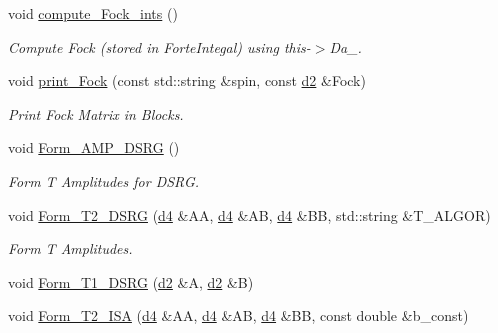 \begin{DoxyCompactItemize}
void \mbox{\hyperlink{classforte_1_1_m_c_s_r_g_p_t2___m_o_a81f13aa73866cbd8dd1589ffcce6de8f}{compute\+\_\+\+Fock\+\_\+ints}} ()
\begin{DoxyCompactList}\small\item\em Compute Fock (stored in Forte\+Integal) using this-\/$>$Da\+\_\+. \end{DoxyCompactList}\item 
void \mbox{\hyperlink{classforte_1_1_m_c_s_r_g_p_t2___m_o_a3090cb11611f7d3bd74dcb59ee431ffb}{print\+\_\+\+Fock}} (const std\+::string \&spin, const \mbox{\hyperlink{mcsrgpt2__mo_8h_ae5de8a172a3b363a852d6d32e6d90537}{d2}} \&Fock)
\begin{DoxyCompactList}\small\item\em Print Fock Matrix in Blocks. \end{DoxyCompactList}\item 
void \mbox{\hyperlink{classforte_1_1_m_c_s_r_g_p_t2___m_o_a220d94aaf515b4fa7ed3aec37f552baa}{Form\+\_\+\+A\+M\+P\+\_\+\+D\+S\+RG}} ()
\begin{DoxyCompactList}\small\item\em Form T Amplitudes for D\+S\+RG. \end{DoxyCompactList}\item 
void \mbox{\hyperlink{classforte_1_1_m_c_s_r_g_p_t2___m_o_a0ed08f7a03042f89508ab41377d970ea}{Form\+\_\+\+T2\+\_\+\+D\+S\+RG}} (\mbox{\hyperlink{mcsrgpt2__mo_8h_a0a2245afece5cd37d3b0b6a462927f69}{d4}} \&AA, \mbox{\hyperlink{mcsrgpt2__mo_8h_a0a2245afece5cd37d3b0b6a462927f69}{d4}} \&AB, \mbox{\hyperlink{mcsrgpt2__mo_8h_a0a2245afece5cd37d3b0b6a462927f69}{d4}} \&BB, std\+::string \&T\+\_\+\+A\+L\+G\+OR)
\begin{DoxyCompactList}\small\item\em Form T Amplitudes. \end{DoxyCompactList}\item 
void \mbox{\hyperlink{classforte_1_1_m_c_s_r_g_p_t2___m_o_aa5fe840d496431af5e53ba309e30a747}{Form\+\_\+\+T1\+\_\+\+D\+S\+RG}} (\mbox{\hyperlink{mcsrgpt2__mo_8h_ae5de8a172a3b363a852d6d32e6d90537}{d2}} \&A, \mbox{\hyperlink{mcsrgpt2__mo_8h_ae5de8a172a3b363a852d6d32e6d90537}{d2}} \&B)
\item 
void \mbox{\hyperlink{classforte_1_1_m_c_s_r_g_p_t2___m_o_af679c23cc0988a503c06a45caabc9c38}{Form\+\_\+\+T2\+\_\+\+I\+SA}} (\mbox{\hyperlink{mcsrgpt2__mo_8h_a0a2245afece5cd37d3b0b6a462927f69}{d4}} \&AA, \mbox{\hyperlink{mcsrgpt2__mo_8h_a0a2245afece5cd37d3b0b6a462927f69}{d4}} \&AB, \mbox{\hyperlink{mcsrgpt2__mo_8h_a0a2245afece5cd37d3b0b6a462927f69}{d4}} \&BB, const double \&b\+\_\+const)

\end{DoxyCompactItemize}
